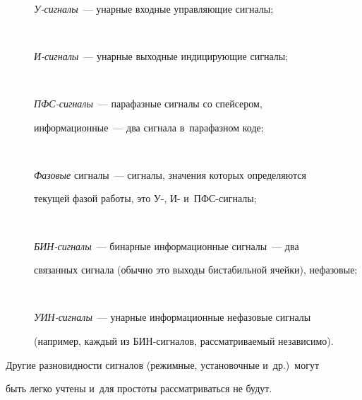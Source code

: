    \begin{description}


\item[\,]  \textit{У-сигналы}~--- унарные входные управляющие сигналы;\\[-13pt]


   


\item[\,]    \textit{И-сигналы}~--- унарные выходные индицирующие сигналы;\\[-13pt]


   


\item[\,] \textit{ПФС-сигналы}~--- парафазные сигналы со спейсером, 


информационные~--- два сигнала в~парафазном коде;\\[-13pt]


   


\item[\,]     \textit{Фазовые} сигналы~--- сигналы, значения которых определяются 


текущей фазой работы, это У-, И- и~ПФС-сигналы;\\[-13pt]


   


\item[\,]    \textit{БИН-сигналы}~--- бинарные информационные сигналы~--- два 


связанных сигнала (обычно это выходы бистабильной ячейки), нефазовые;\\[-13pt]


   


\item[\,]    \textit{УИН-сигналы}~--- унарные информационные нефазовые сигналы 


(например, каждый из БИН-сиг\-на\-лов, рассматриваемый независимо).


\end{description}


   


   Другие разновидности сигналов (режимные, установочные и~др.)\ могут 


быть легко учтены и~для простоты рассматриваться не будут.


   


